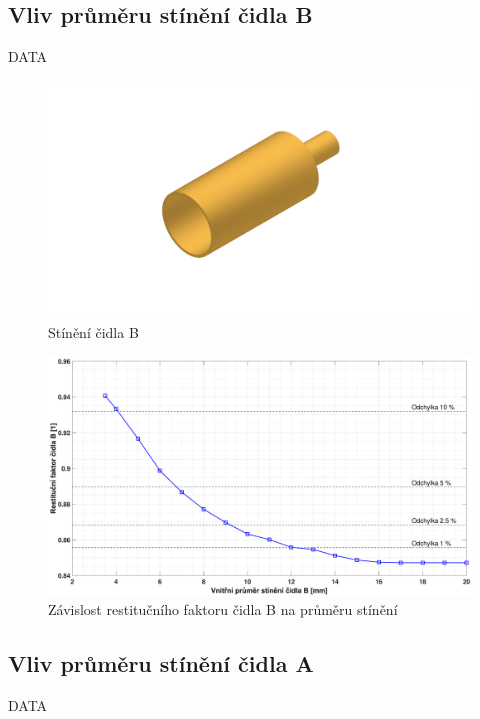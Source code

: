     \newpage
    \subsection{Vliv průměru stínění čidla B}
        DATA
        
        \begin{figure}[ht!]
            \centering
            \includegraphics[width=\textwidth]{400_SIMULACE_KONSTRUKCNICH_UPRAV/Vykresy_rendery/Stineni_B.png}
            \caption{Stínění čidla B}
            \label{fig:stineni-B}
        \end{figure}
        
        
        \begin{figure}[ht!]
            \centering
            \includegraphics*[width=\textwidth, trim={5.9cm 1.0cm 5.8cm 2.0cm}]{400_SIMULACE_KONSTRUKCNICH_UPRAV/Grafy/04_prumer_stineni_B}
            \caption{Závislost restitučního faktoru čidla B na průměru stínění}
            \label{fig:prumer-stineni-B}
        \end{figure}
    
    \newpage
    \subsection{Vliv průměru stínění čidla A} \label{sec:stineni-A}
        DATA
        
